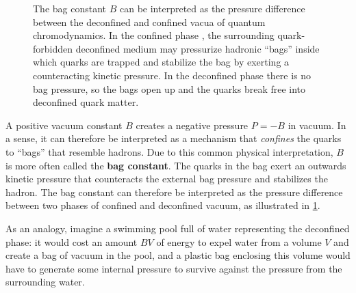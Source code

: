 \begin{figure}[t]
{
}
\caption{\label{fig:mit:bag_constant}%
	The bag constant $B$ can be interpreted as the pressure difference between the deconfined and confined vacua of quantum chromodynamics.
	In the confined phase ,
	the surrounding quark-forbidden deconfined medium may pressurize hadronic ``bags''
	inside which quarks are trapped and stabilize the bag by exerting a counteracting kinetic pressure.
	In the deconfined phase  there is no bag pressure,
	so the bags open up and the quarks break free into deconfined quark matter.
}
\end{figure}


A positive vacuum constant $B$ creates a negative pressure $P = -B$ in vacuum.
In a sense, it can therefore be interpreted as a mechanism that \emph{confines} the quarks to ``bags'' that resemble hadrons.
Due to this common physical interpretation, $B$ is more often called the \textbf{bag constant}.
The quarks in the bag exert an outwards kinetic pressure that counteracts the external bag pressure and stabilizes the hadron.
The bag constant can therefore be interpreted as the pressure difference between two phases of confined and deconfined vacuum,
as illustrated in \cref{fig:mit:bag_constant}.

As an analogy, imagine a swimming pool full of water representing the deconfined phase:
it would cost an amount $BV$ of energy to expel water from a volume $V$ and create a bag of vacuum in the pool,
and a plastic bag enclosing this volume would have to generate some internal pressure to survive against the pressure from the surrounding water.

